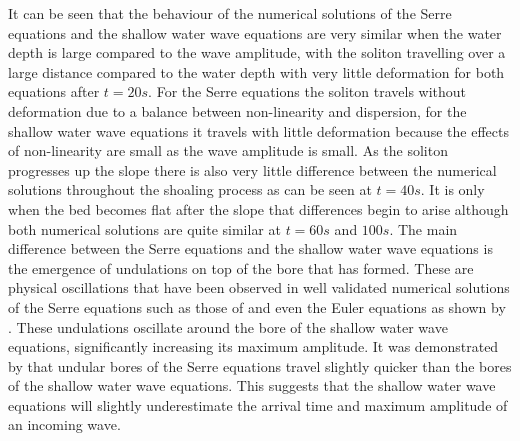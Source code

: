 \documentclass[a4paper,fleqn]{article} %
\begin{document}
It can be seen that the behaviour of the numerical solutions of the Serre equations and the shallow water wave equations are very similar when the water depth is large compared to the wave amplitude, with the soliton travelling over a large distance compared to the water depth with very little deformation for both equations after $t=20s$. For the Serre equations the soliton travels without deformation due to a balance between non-linearity and dispersion, for the shallow water wave equations it travels with little deformation because the effects of non-linearity are small as the wave amplitude is small. As the soliton progresses up the slope there is also very little difference between the numerical solutions throughout the shoaling process as can be seen at $t=40s$. It is only when the bed becomes flat after the slope that differences begin to arise although both numerical solutions are quite similar at $t=60s$ and $100s$. The main difference between the Serre equations and the shallow water wave equations is the emergence of undulations on top of the bore that has formed. These are physical oscillations that have been observed in well validated numerical solutions of the Serre equations such as those of \cite{Mitsotakis-etal-2014} and even the Euler equations as shown by \cite{Mitsotakis-etal-2017}. These undulations oscillate around the bore of the shallow water wave equations, significantly increasing its maximum amplitude. It was demonstrated by \cite{Pitt-2017} that undular bores of the Serre equations travel slightly quicker than the bores of the shallow water wave equations. This suggests that the shallow water wave equations will slightly underestimate the arrival time and maximum amplitude of an incoming wave.
\end{document}
